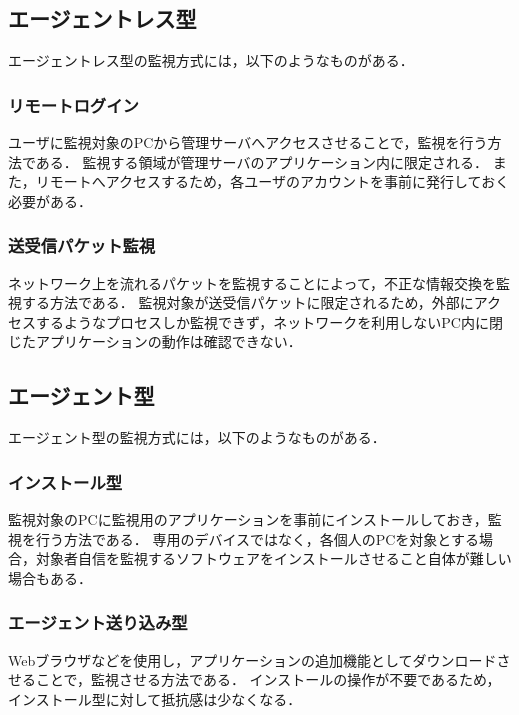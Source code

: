 \subsection{エージェントレス型}
エージェントレス型の監視方式には，以下のようなものがある．

\subsubsection{リモートログイン}
ユーザに監視対象のPCから管理サーバへアクセスさせることで，監視を行う方法である．
監視する領域が管理サーバのアプリケーション内に限定される．
また，リモートへアクセスするため，各ユーザのアカウントを事前に発行しておく必要がある．

\subsubsection{送受信パケット監視}
ネットワーク上を流れるパケットを監視することによって，不正な情報交換を監視する方法である．
監視対象が送受信パケットに限定されるため，外部にアクセスするようなプロセスしか監視できず，ネットワークを利用しないPC内に閉じたアプリケーションの動作は確認できない．

\subsection{エージェント型}
エージェント型の監視方式には，以下のようなものがある．

\subsubsection{インストール型}
監視対象のPCに監視用のアプリケーションを事前にインストールしておき，監視を行う方法である．
専用のデバイスではなく，各個人のPCを対象とする場合，対象者自信を監視するソフトウェアをインストールさせること自体が難しい場合もある．

\subsubsection{エージェント送り込み型}
Webブラウザなどを使用し，アプリケーションの追加機能としてダウンロードさせることで，監視させる方法である．
インストールの操作が不要であるため，インストール型に対して抵抗感は少なくなる．


